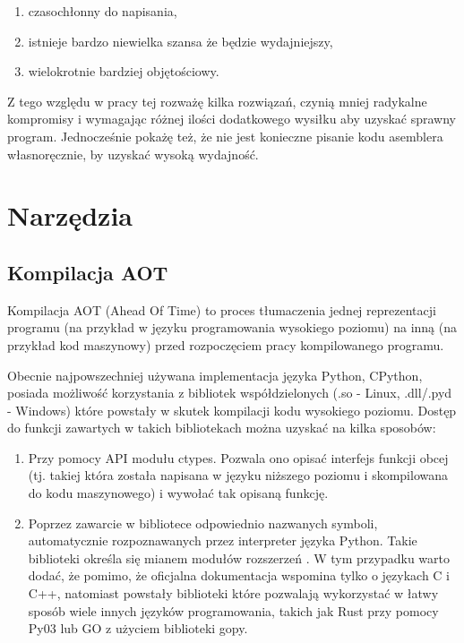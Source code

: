 \documentclass[11pt, a4paper]{article}
\begin{document}
\begin{sloppypar}
\begin{enumerate}
      \item czasochłonny do napisania,

      \item istnieje bardzo niewielka szansa że będzie wydajniejszy,

      \item wielokrotnie bardziej objętościowy.
    \end{enumerate}

    Z tego względu w pracy tej rozważę kilka rozwiązań, czynią mniej radykalne kompromisy
    i wymagając różnej ilości dodatkowego wysiłku aby uzyskać sprawny program.
    Jednocześnie pokażę też, że nie jest konieczne pisanie kodu asemblera własnoręcznie,
    by uzyskać wysoką wydajność.

    \section{Narzędzia}
    \subsection{Kompilacja AOT}
    Kompilacja AOT (Ahead Of Time) to proces tłumaczenia jednej reprezentacji programu (na
    przykład w języku programowania wysokiego poziomu) na inną (na przykład kod maszynowy)
    przed rozpoczęciem pracy kompilowanego programu.

    Obecnie najpowszechniej używana implementacja języka Python, CPython, posiada
    możliwość korzystania z bibliotek współdzielonych (.so - Linux, .dll/.pyd - Windows)
    które powstały w skutek kompilacji kodu wysokiego poziomu. Dostęp do funkcji zawartych
    w takich bibliotekach można uzyskać na kilka sposobów:

    \begin{enumerate}
      \item Przy pomocy API modułu ctypes\cite{Python_ctypes}. Pozwala ono opisać interfejs
        funkcji obcej (tj. takiej która została napisana w języku niższego poziomu i skompilowana
        do kodu maszynowego) i wywołać tak opisaną funkcję.

      \item Poprzez zawarcie w bibliotece odpowiednio nazwanych symboli, automatycznie
        rozpoznawanych przez interpreter języka Python. Takie biblioteki określa się mianem
        modułów rozszerzeń \cite{Extending_Python_With_C_Cpp}. W tym przypadku warto
        dodać, że pomimo, że oficjalna dokumentacja wspomina tylko o językach C i C++, natomiast
        powstały biblioteki które pozwalają wykorzystać w łatwy sposób wiele innych języków
        programowania, takich jak Rust przy pomocy Py03\cite{PyO3} lub GO z użyciem biblioteki
        gopy\cite{gopy}.


\end{enumerate}
\end{sloppypar}
\end{document}
